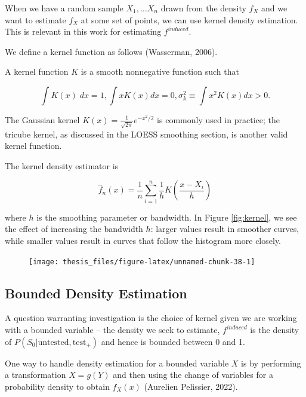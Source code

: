 \documentclass[12pt,twoside]{smiththesis}
\begin{document}
When we have a random sample \(X_1,\dots X_n\) drawn from the density \(f_X\) and we want to estimate \(f_X\) at some set of points, we can use kernel density estimation. This is relevant in this work for estimating \(f^{induced}\).

We define a kernel function as follows (Wasserman, 2006).
\begin{tcolorbox}[title=Definition: Kernel Function]

A kernel function $K$ is a smooth nonnegative function such that 

$$\int K(x) \; dx = 1, \int x K(x) dx = 0, \sigma^2_k \equiv \int x^2 K(x) dx > 0.$$ 
\end{tcolorbox}
The Gaussian kernel \(K(x) = \frac{1}{\sqrt{2\pi}}e^{-x^2/2}\) is commonly used in practice; the tricube kernel, as discussed in the LOESS smoothing section, is another valid kernel function.

The kernel density estimator is

\[\hat f_n(x) = \frac 1n \sum_{i=1}^n \frac 1h K\left(\dfrac{x-X_i}{h} \right)\]

where \(h\) is the smoothing parameter or bandwidth. In Figure \ref{fig:kernel}, we see the effect of increasing the bandwidth \(h\): larger values result in smoother curves, while smaller values result in curves that follow the histogram more closely.
\begin{figure}

{\centering \texttt{[image: thesis\_files/figure-latex/unnamed-chunk-38-1]} 

}

\caption{\label{fig:kernel}}\label{fig:unnamed-chunk-38}
\end{figure}
\hypertarget{bounded-density-estimation}{%
\subsection{Bounded Density Estimation}\label{bounded-density-estimation}}

A question warranting investigation is the choice of kernel given we are working with a bounded variable -- the density we seek to estimate, \(f^{induced}\) is the density of \(P(S_0|\text{untested}, \text{test}_+)\) and hence is bounded between 0 and 1.

One way to handle density estimation for a bounded variable \(X\) is by performing a transformation
\(X=g(Y)\) and then using the change of variables for a probability density to obtain \(f_X(x)\) (Aurelien Pelissier, 2022).
\end{document}
